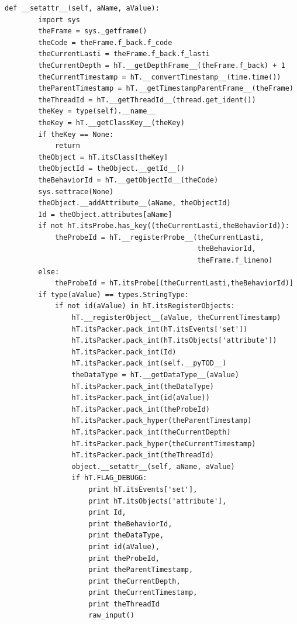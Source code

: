 \documentclass[12pt,legalpaper]{report}
\begin{document}
\begin{singlespace}
\begin{lstlisting}[style=Python]
    def __setattr__(self, aName, aValue):
        import sys
        theFrame = sys._getframe()
        theCode = theFrame.f_back.f_code
        theCurrentLasti = theFrame.f_back.f_lasti
        theCurrentDepth = hT.__getDepthFrame__(theFrame.f_back) + 1
        theCurrentTimestamp = hT.__convertTimestamp__(time.time()) 
        theParentTimestamp = hT.__getTimestampParentFrame__(theFrame)
        theThreadId = hT.__getThreadId__(thread.get_ident())
        theKey = type(self).__name__
        theKey = hT.__getClassKey__(theKey)
        if theKey == None:
            return
        theObject = hT.itsClass[theKey] 
        theObjectId = theObject.__getId__()
        theBehaviorId = hT.__getObjectId__(theCode)
        sys.settrace(None)
        theObject.__addAttribute__(aName, theObjectId)
        Id = theObject.attributes[aName]
        if not hT.itsProbe.has_key((theCurrentLasti,theBehaviorId)):
            theProbeId = hT.__registerProbe__(theCurrentLasti,
                                              theBehaviorId,
                                              theFrame.f_lineno)
        else:
            theProbeId = hT.itsProbe[(theCurrentLasti,theBehaviorId)]          
        if type(aValue) == types.StringType:
            if not id(aValue) in hT.itsRegisterObjects:
                hT.__registerObject__(aValue, theCurrentTimestamp)
                hT.itsPacker.pack_int(hT.itsEvents['set'])
                hT.itsPacker.pack_int(hT.itsObjects['attribute'])
                hT.itsPacker.pack_int(Id)
                hT.itsPacker.pack_int(self.__pyTOD__)
                theDataType = hT.__getDataType__(aValue)
                hT.itsPacker.pack_int(theDataType)
                hT.itsPacker.pack_int(id(aValue))
                hT.itsPacker.pack_int(theProbeId)
                hT.itsPacker.pack_hyper(theParentTimestamp)        
                hT.itsPacker.pack_int(theCurrentDepth)
                hT.itsPacker.pack_hyper(theCurrentTimestamp)
                hT.itsPacker.pack_int(theThreadId)
                object.__setattr__(self, aName, aValue)
                if hT.FLAG_DEBUGG:
                    print hT.itsEvents['set'],
                    print hT.itsObjects['attribute'],
                    print Id,
                    print theBehaviorId,
                    print theDataType,
                    print id(aValue),
                    print theProbeId,
                    print theParentTimestamp,
                    print theCurrentDepth,
                    print theCurrentTimestamp,
                    print theThreadId
                    raw_input()

\end{lstlisting}
\end{singlespace}
\end{document}

